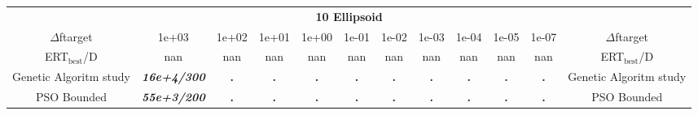 \begin{tabular}{cccccccccccc}
 & \multicolumn{10}{c}{{\normalsize \textbf{10 Ellipsoid}}}\\
$\Delta$ftarget& 1e+03& 1e+02& 1e+01& 1e+00& 1e-01& 1e-02& 1e-03& 1e-04& 1e-05& 1e-07 & $\Delta$ftarget \\
ERT$_{\textrm{best}}$/D& nan& nan& nan& nan& nan& nan& nan& nan& nan& nan & ERT$_{\textrm{best}}$/D \\
\hline
Genetic Algoritm study & \textbf{\textit{16e+4}\textit{/300}} & \textbf{.} & \textbf{.} & \textbf{.} & \textbf{.} & \textbf{.} & \textbf{.} & \textbf{.} & \textbf{.} & \textbf{.} & Genetic Algoritm study \cite{add_an_entry_for_Genetic Algoritm study_in_bbob.bib}\\
PSO Bounded & \textbf{\textit{55e+3}\textit{/200}} & \textbf{.} & \textbf{.} & \textbf{.} & \textbf{.} & \textbf{.} & \textbf{.} & \textbf{.} & \textbf{.} & \textbf{.} & PSO Bounded \cite{add_an_entry_for_PSO Bounded_in_bbob.bib}
\end{tabular}
